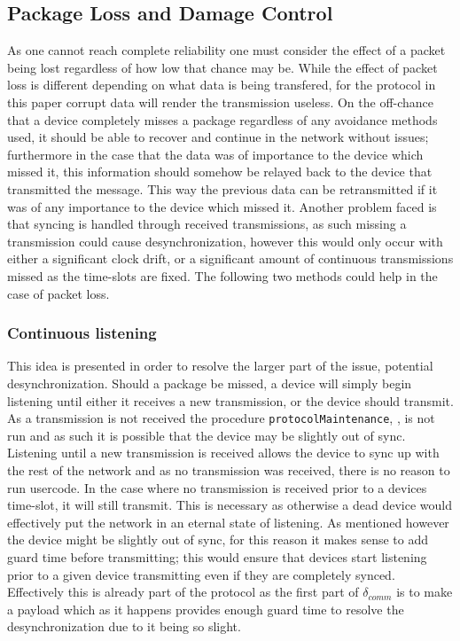 \subsection{Package Loss and Damage Control}
As one cannot reach complete reliability one must consider the effect of a packet being lost regardless of how low that chance may be.
While the effect of packet loss is different depending on what data is being transfered, for the protocol in this paper corrupt data will render the transmission useless.
On the off-chance that a device completely misses a package regardless of any avoidance methods used, it should be able to recover and continue in the network without issues; furthermore in the case that the data was of importance to the device which missed it, this information should somehow be relayed back to the device that transmitted the message.
This way the previous data can be retransmitted if it was of any importance to the device which missed it.
Another problem faced is that syncing is handled through received transmissions, as such missing a transmission could cause desynchronization, however this would only occur with either a significant clock drift, or a significant amount of continuous transmissions missed as the time-slots are fixed.
The following two methods could help in the case of packet loss.

\subsubsection*{Continuous listening}\label{contListen}
This idea is presented in order to resolve the larger part of the issue, potential desynchronization.
Should a package be missed, a device will simply begin listening until either it receives a new transmission, or the device should transmit.
As a transmission is not received the procedure \texttt{protocolMaintenance}, , is not run and as such it is possible that the device may be slightly out of sync.
Listening until a new transmission is received allows the device to sync up with the rest of the network and as no transmission was received, there is no reason to run usercode.
In the case where no transmission is received prior to a devices time-slot, it will still transmit.
This is necessary as otherwise a dead device would effectively put the network in an eternal state of listening.
As mentioned however the device might be slightly out of sync, for this reason it makes sense to add guard time before transmitting; this would ensure that devices start listening prior to a given device transmitting even if they are completely synced.
Effectively this is already part of the protocol as the first part of $\delta_{comm}$ is to make a payload which as it happens provides enough guard time to resolve the desynchronization due to it being so slight.


